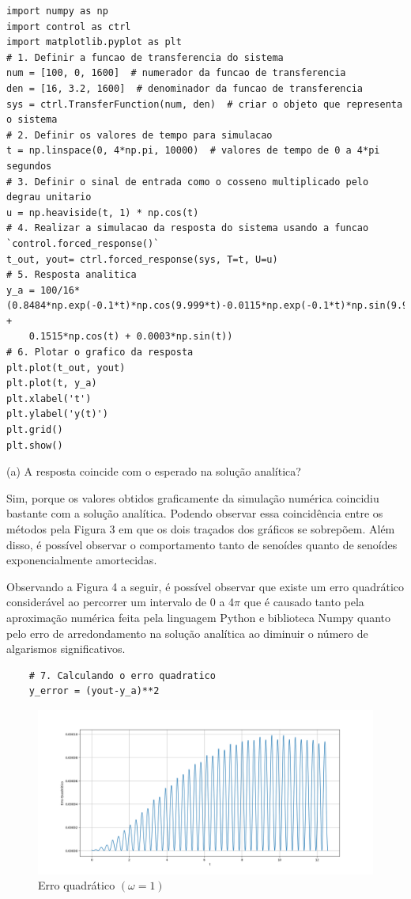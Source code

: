 \documentclass[10pt]{article}
\begin{document}
\begin{lstlisting}
import numpy as np
import control as ctrl
import matplotlib.pyplot as plt
# 1. Definir a funcao de transferencia do sistema
num = [100, 0, 1600]  # numerador da funcao de transferencia
den = [16, 3.2, 1600]  # denominador da funcao de transferencia
sys = ctrl.TransferFunction(num, den)  # criar o objeto que representa o sistema
# 2. Definir os valores de tempo para simulacao
t = np.linspace(0, 4*np.pi, 10000)  # valores de tempo de 0 a 4*pi segundos
# 3. Definir o sinal de entrada como o cosseno multiplicado pelo degrau unitario
u = np.heaviside(t, 1) * np.cos(t)
# 4. Realizar a simulacao da resposta do sistema usando a funcao `control.forced_response()`
t_out, yout= ctrl.forced_response(sys, T=t, U=u)
# 5. Resposta analitica
y_a = 100/16*(0.8484*np.exp(-0.1*t)*np.cos(9.999*t)-0.0115*np.exp(-0.1*t)*np.sin(9.999*t) +
    0.1515*np.cos(t) + 0.0003*np.sin(t))
# 6. Plotar o grafico da resposta
plt.plot(t_out, yout)
plt.plot(t, y_a)
plt.xlabel('t')
plt.ylabel('y(t)')
plt.grid()
plt.show()
\end{lstlisting}

(a) A resposta coincide com o esperado na solução analítica?

\quad Sim, porque os valores obtidos graficamente da simulação numérica coincidiu bastante com a solução analítica.
Podendo observar essa coincidência entre os métodos pela Figura 3 em que os dois traçados dos gráficos se sobrepõem.
Além disso, é possível observar o comportamento tanto de senoídes quanto de senoídes exponencialmente amortecidas.

\quad Observando a Figura 4 a seguir, é possível observar que existe um erro quadrático considerável
ao percorrer um intervalo de 0 a 4$\pi$ que é causado tanto pela aproximação numérica feita pela linguagem Python e biblioteca Numpy
quanto pelo erro de arredondamento na solução analítica ao diminuir o número de algarismos significativos.

\begin{lstlisting}
    # 7. Calculando o erro quadratico
    y_error = (yout-y_a)**2
\end{lstlisting}

\newpage

\begin{figure}[h]
    \centering
    \includegraphics[scale=0.4]{erro1.png}
    \caption{Erro quadrático $(\omega = 1)$}
\end{figure}
\end{document}
